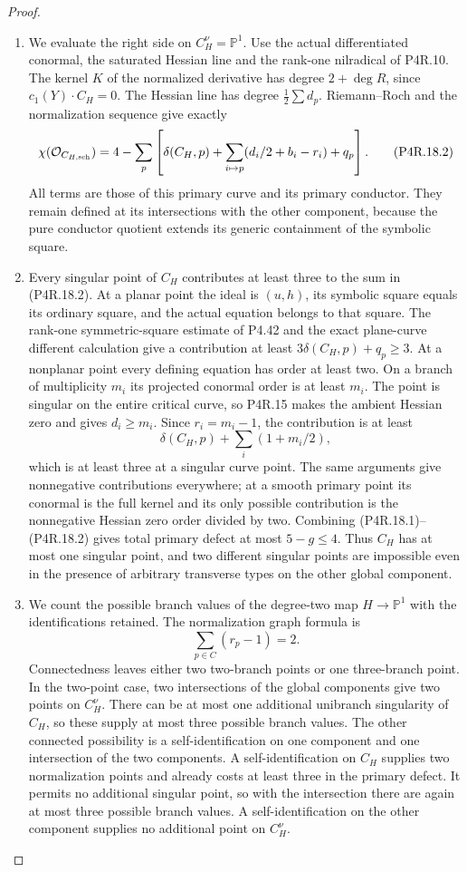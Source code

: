 \begin{proof}
\begin{enumerate}[label={$\langle1\rangle$\arabic*.},leftmargin=*]
\item We evaluate the right side on $C_H^\nu=\mathbb P^1$.
Use the actual differentiated conormal, the saturated Hessian
line and the rank-one nilradical of P4R.10. The kernel $K$
of the normalized derivative has degree $2+\deg R$, since
$c_1(Y)\cdot C_H=0$. The Hessian line has degree
$\tfrac12\sum d_p$. Riemann--Roch and the normalization
sequence give exactly
\[
 \chi(\mathcal O_{C_{H,\rm sch}})
 =4-\sum_p\left[\delta(C_H,p)
      +\sum_{i\mapsto p}(d_i/2+b_i-r_i)+q_p\right].
                                                            \tag{P4R.18.2}
\]
All terms are those of this primary curve and its primary
conductor. They remain defined at its intersections with
the other component, because the pure conductor quotient
extends its generic containment of the symbolic square.

\item Every singular point of $C_H$ contributes at least three
to the sum in (P4R.18.2). At a planar point the ideal is
$(u,h)$, its symbolic square equals its ordinary square,
and the actual equation belongs to that square. The
rank-one symmetric-square estimate of P4.42 and the exact
plane-curve different calculation give a contribution at
least $3\delta(C_H,p)+q_p\ge3$.
At a nonplanar point every defining equation has order at
least two. On a branch of multiplicity $m_i$ its projected
conormal order is at least $m_i$. The point is singular
on the entire critical curve, so P4R.15 makes the ambient
Hessian zero and gives $d_i\ge m_i$. Since $r_i=m_i-1$,
the contribution is at least
\[
                      \delta(C_H,p)+\sum_i(1+m_i/2),
\]
which is at least three at a singular curve point. The
same arguments give nonnegative contributions everywhere;
at a smooth primary point its conormal is the full kernel
and its only possible contribution is the nonnegative
Hessian zero order divided by two.
Combining (P4R.18.1)--(P4R.18.2) gives total primary
defect at most $5-g\le4$. Thus $C_H$ has at most one
singular point, and two different singular points are
impossible even in the presence of arbitrary transverse
types on the other global component.

\item We count the possible branch values of the degree-two map
$H\to\mathbb P^1$ with the identifications retained.
The normalization graph formula is
\[
                         \sum_{p\in C}(r_p-1)=2.
\]
Connectedness leaves either two two-branch points or one
three-branch point. In the two-point case, two intersections
of the global components give two points on $C_H^\nu$.
There can be at most one additional unibranch singularity
of $C_H$, so these supply at most three possible branch
values. The other connected possibility is a self-identification
on one component and one intersection of the two components.
A self-identification on $C_H$ supplies two normalization
points and already costs at least three in the primary
defect. It permits no additional singular point, so with
the intersection there are again at most three possible
branch values. A self-identification on the other component
supplies no additional point on $C_H^\nu$.


\end{enumerate}
\end{proof}
